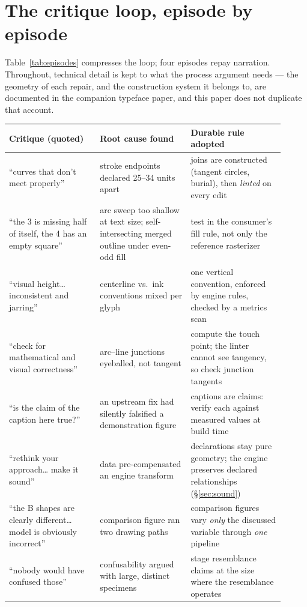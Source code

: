 \documentclass[11pt]{article}
\begin{document}
\section{The critique loop, episode by episode}\label{sec:episodes}

Table~\ref{tab:episodes} compresses the loop; four episodes repay narration. Throughout, technical detail is kept to what the process argument needs — the geometry of each repair, and the construction system it belongs to, are documented in the companion typeface paper, and this paper does not duplicate that account.

\begin{table}[t]\centering\small
\begin{tabular}{p{0.30\linewidth}p{0.30\linewidth}p{0.31\linewidth}}
\toprule
Critique (quoted) & Root cause found & Durable rule adopted \\
\midrule
``curves that don't meet properly'' & stroke endpoints declared 25--34 units apart & joins are constructed (tangent circles, burial), then \emph{linted} on every edit \\
``the 3 is missing half of itself, the 4 has an empty square'' & arc sweep too shallow at text size; self-intersecting merged outline under even-odd fill & test in the consumer's fill rule, not only the reference rasterizer \\
``visual height\ldots{} inconsistent and jarring'' & centerline vs.\ ink conventions mixed per glyph & one vertical convention, enforced by engine rules, checked by a metrics scan \\
``check for mathematical and visual correctness'' & arc--line junctions eyeballed, not tangent & compute the touch point; the linter cannot see tangency, so check junction tangents \\
``is the claim of the caption here true?'' & an upstream fix had silently falsified a demonstration figure & captions are claims: verify each against measured values at build time \\
``rethink your approach\ldots{} make it sound'' & data pre-compensated an engine transform & declarations stay pure geometry; the engine preserves declared relationships (§\ref{sec:sound}) \\
``the B shapes are clearly different\ldots{} model is obviously incorrect'' & comparison figure ran two drawing paths & comparison figures vary \emph{only} the discussed variable through \emph{one} pipeline \\
``nobody would have confused those'' & confusability argued with large, distinct specimens & stage resemblance claims at the size where the resemblance operates \\

\end{tabular}
\end{table}
\end{document}
